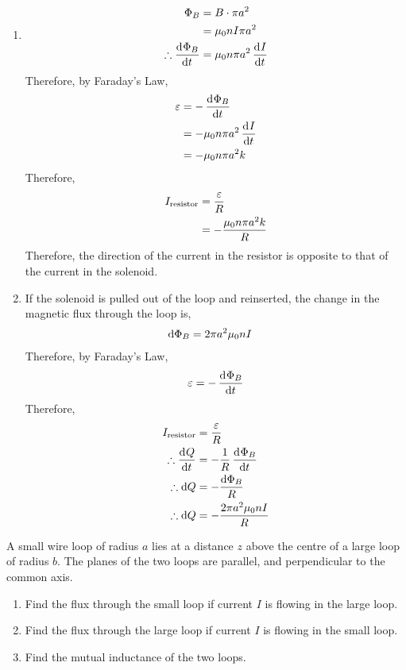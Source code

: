 \documentclass[fleqn, a4paper, 11pt, oneside]{amsart}
\theoremstyle{definition}
\theoremstyle{theorem}
\begin{document}
\begin{solution}
	\begin{enumerate}[leftmargin = *]
		\item
			\begin{align*}
				\Phi_B &= B \cdot \pi a^2\\
				&= \mu_0 n I \pi a^2\\
				\therefore \dod{\Phi_B}{t} &= \mu_0 n \pi a^2 \dod{I}{t}
			\end{align*}
			Therefore, by Faraday's Law,
			\begin{align*}
				\varepsilon &= -\dod{\Phi_B}{t}\\
				&= -\mu_0 n \pi a^2 \dod{I}{t}\\
				&= -\mu_0 n \pi a^2 k
			\end{align*}
			Therefore,
			\begin{align*}
				I_{\textnormal{resistor}} &= \frac{\varepsilon}{R}\\
				&= -\frac{\mu_0 n \pi a^2 k}{R}
			\end{align*}
			Therefore, the direction of the current in the resistor is opposite to that of the current in the solenoid.
		\item
			If the solenoid is pulled out of the loop and reinserted, the change in the magnetic flux through the loop is,
			\begin{align*}
				\dif \Phi_B &= 2 \pi a^2 \mu_0 n I
			\end{align*}
			Therefore, by Faraday's Law,
			\begin{align*}
				\varepsilon &= -\dod{\Phi_B}{t}\\
			\end{align*}
			Therefore,
			\begin{align*}
				I_{\textnormal{resistor}} &= \frac{\varepsilon}{R}\\
				\therefore \dod{Q}{t} &= -\frac{1}{R} \dod{\Phi_B}{t}\\
				\therefore \dif Q &= -\frac{\dif \Phi_B}{R}\\
				\therefore \dif Q &= -\frac{2 \pi a^2 \mu_0 n I}{R}
			\end{align*}
	\end{enumerate}
\end{solution}

\begin{question}
	A small wire loop of radius $a$ lies at a distance $z$ above the centre of a large loop of radius $b$.
	The planes of the two loops are parallel, and perpendicular to the common axis.
	\begin{enumerate}
		\item Find the flux through the small loop if current $I$ is flowing in the large loop.
		\item Find the flux through the large loop if current $I$ is flowing in the small loop.
		\item Find the mutual inductance of the two loops.
	\end{enumerate}
\end{question}
\end{document}
